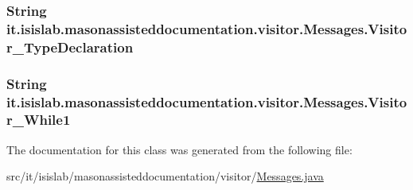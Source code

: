 \hypertarget{classit_1_1isislab_1_1masonassisteddocumentation_1_1visitor_1_1_messages_aada96700b6bc6b9e83d8241c0f6fc21f}{
\subsubsection[{Visitor\-\_\-\-Type\-Declaration}]{\setlength{\rightskip}{0pt plus 5cm}String it.\-isislab.\-masonassisteddocumentation.\-visitor.\-Messages.\-Visitor\-\_\-\-Type\-Declaration\hspace{0.3cm}{\ttfamily [static]}}}\label{classit_1_1isislab_1_1masonassisteddocumentation_1_1visitor_1_1_messages_aada96700b6bc6b9e83d8241c0f6fc21f}
\hypertarget{classit_1_1isislab_1_1masonassisteddocumentation_1_1visitor_1_1_messages_abcdee35cefbd746cc562cf6fe451d36d}{
\subsubsection[{Visitor\-\_\-\-While1}]{\setlength{\rightskip}{0pt plus 5cm}String it.\-isislab.\-masonassisteddocumentation.\-visitor.\-Messages.\-Visitor\-\_\-\-While1\hspace{0.3cm}{\ttfamily [static]}}}\label{classit_1_1isislab_1_1masonassisteddocumentation_1_1visitor_1_1_messages_abcdee35cefbd746cc562cf6fe451d36d}


The documentation for this class was generated from the following file\-:\begin{DoxyCompactItemize}
\item 
src/it/isislab/masonassisteddocumentation/visitor/\hyperlink{visitor_2_messages_8java}{Messages.\-java}\end{DoxyCompactItemize}
